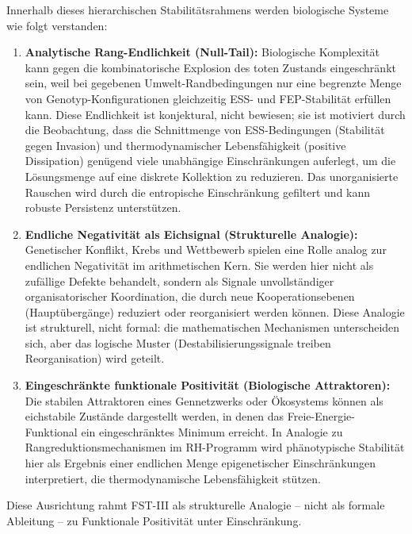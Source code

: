 \documentclass[12pt,a4paper]{article}
\theoremstyle{remark}
\begin{document}
Innerhalb dieses hierarchischen Stabilitätsrahmens werden biologische Systeme wie folgt verstanden:
\begin{enumerate}[label=\alph*)]
    \item \textbf{Analytische Rang-Endlichkeit (Null-Tail):} Biologische Komplexität kann gegen die kombinatorische Explosion des \glqq toten\grqq{} Zustands eingeschränkt sein, weil bei gegebenen Umwelt-Randbedingungen nur eine begrenzte Menge von Genotyp-Konfigurationen gleichzeitig ESS- und FEP-Stabilität erfüllen kann. Diese Endlichkeit ist konjektural, nicht bewiesen; sie ist motiviert durch die Beobachtung, dass die Schnittmenge von ESS-Bedingungen (Stabilität gegen Invasion) und thermodynamischer Lebensfähigkeit (positive Dissipation) genügend viele unabhängige Einschränkungen auferlegt, um die Lösungsmenge auf eine diskrete Kollektion zu reduzieren. Das unorganisierte \glqq Rauschen\grqq{} wird durch die entropische Einschränkung gefiltert und kann robuste Persistenz unterstützen.
    \item \textbf{Endliche Negativität als Eichsignal (Strukturelle Analogie):} Genetischer Konflikt, Krebs und Wettbewerb spielen eine Rolle analog zur endlichen Negativität im arithmetischen Kern. Sie werden hier nicht als zufällige Defekte behandelt, sondern als Signale unvollständiger organisatorischer Koordination, die durch neue Kooperationsebenen (Hauptübergänge) reduziert oder reorganisiert werden können. Diese Analogie ist strukturell, nicht formal: die mathematischen Mechanismen unterscheiden sich, aber das logische Muster (Destabilisierungssignale treiben Reorganisation) wird geteilt.
    \item \textbf{Eingeschränkte funktionale Positivität (Biologische Attraktoren):} Die stabilen Attraktoren eines Gennetzwerks oder Ökosystems können als \glqq eichstabile\grqq{} Zustände dargestellt werden, in denen das Freie-Energie-Funktional ein eingeschränktes Minimum erreicht. In Analogie zu Rangreduktionsmechanismen im RH-Programm wird phänotypische Stabilität hier als Ergebnis einer endlichen Menge epigenetischer Einschränkungen interpretiert, die thermodynamische Lebensfähigkeit stützen.
\end{enumerate}

Diese Ausrichtung rahmt FST-III als strukturelle Analogie -- nicht als formale Ableitung -- zu \glqq Funktionale Positivität unter Einschränkung\grqq{}.
\end{document}
